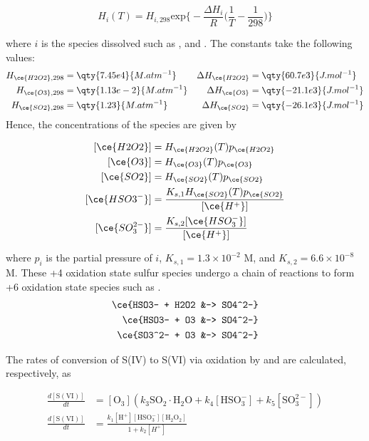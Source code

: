 \begin{equation}
    H_i(T) = H_{i,298}\mathrm{exp} \bigg\{ -\frac{\Delta H_i}{R} \bigg( \frac{1}{T} - \frac{1}{298} \bigg) \bigg\} \label{ch1:eq:Henry-eq}
\end{equation}

where $i$ is the species dissolved such as ,  and .  The constants take the following values: 
\begin{align*}
H_{\ce{H2O2}, 298} &= \qty{7.45e4}{M.atm^{-1}} & 
\Delta H_{\ce{H2O2}} &= \qty{60.7e3}{J.mol^{-1}} \\
H_{\ce{O3}, 298}&=\qty{1.13e-2 }{M.atm^{-1}} & 
\Delta H_{\ce{O3}}&= \qty{-21.1e3}{J.mol^{-1}} \\
H_{\ce{SO2}, 298}&=\qty{1.23}{M.atm^{-1}} 
& \Delta H_{\ce{SO2}}&=\qty{-26.1e3}{J.mol^{-1}} 
\end{align*}
Hence, the concentrations of the species are given by

\begin{equation}
    \begin{aligned}
    \relax
        [\ce{H2O2}] & = H_{\ce{H2O2}}(T)p_{\ce{H2O2}} \\
        [\ce{O3}] & = H_{\ce{O3}}(T)p_{\ce{O3}} \\
        [\ce{SO2}] & = H_{\ce{SO2}}(T)p_{\ce{SO2}} \\
        [\ce{HSO3^-}] & = \frac{K_{s,1}H_{\ce{SO2}}(T)p_{\ce{SO2}}}{[\ce{H^+}]}\\
        [\ce{SO_3^{2-}}] & = \frac{K_{s,2}[\ce{HSO_3^-}]}{[\ce{H^+}]}\\
    \end{aligned}
    \label{ch1:eq:aq-conc}
\end{equation}

where $p_i$ is the partial pressure of $i$,  
$K_{s,1} = 1.3 \times 10^{-2}$ M, and 
$K_{s,2} = 6.6 \times 10^{-8}$ M.  
These +4 oxidation state sulfur species undergo a chain of reactions to form +6 oxidation state species such as . 
\begin{align}
    \ce{HSO3- + H2O2 &-> SO4^2-} \\
    \ce{HSO3- + O3 &-> SO4^2-} \\
    \ce{SO3^2- + O3 &-> SO4^2-} 
\end{align}

The rates of conversion of S(IV) to S(VI) via oxidation by  and  are calculated, respectively, as

\begin{align}
    \frac{d[\mathrm{S(VI)}]}{dt} & = [\mathrm{O_3}]( k_3 \mathrm{SO_2 \cdot H_2O} + k_4 [\mathrm{HSO_3^-}] + k_5 [\mathrm{SO_3^{2-}}]) \label{ch1:eq:so2-o3} \\
    \frac{d[\mathrm{S(VI)}]}{dt} & = \frac{k_1 \mathrm{[H^+][HSO_3^-][H_2O_2]}}{1+k_2[H^+]} \label{ch1:eq:so2-h2o2}
\end{align}

